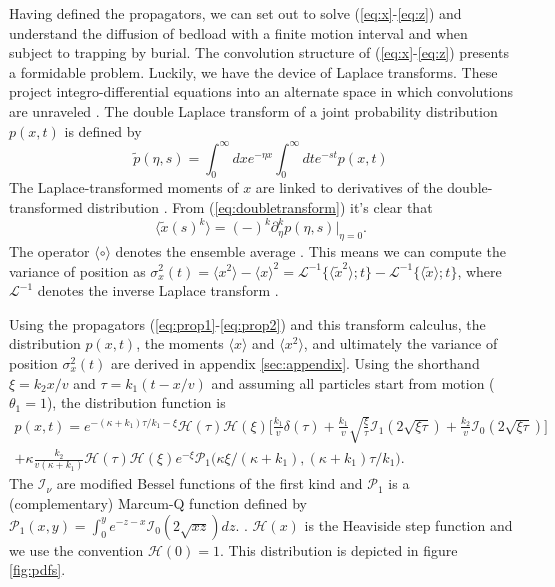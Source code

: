 \documentclass[]{agujournal2018}
\newcommand\be{\begin{equation}}
\newcommand\ee{\end{equation}}
\newcommand\bra{\langle}
\newcommand\ket{\rangle}
\newcommand\El{\mathcal{L}}
\begin{document}
Having defined the propagators, we can set out to solve (\ref{eq:x}-\ref{eq:z}) and understand the diffusion of bedload with a finite motion interval and when subject to trapping by burial.
The convolution structure of (\ref{eq:x}-\ref{eq:z}) presents a formidable problem.
Luckily, we have the device of Laplace transforms.
These project integro-differential equations into an alternate space in which convolutions are unraveled \citep[e.g.][]{Arfken1985}.
The double Laplace transform of a joint probability distribution $p(x,t)$ is defined by 
\be \tilde{p}(\eta,s) = \int_0^\infty dx e^{-\eta x}\int_0^\infty dt e^{-st} p(x,t) \label{eq:doubletransform}\ee
The Laplace-transformed moments of $x$ are linked to derivatives of the double-transformed distribution \citep[e.g.][]{Weeks1998}.
From (\ref{eq:doubletransform}) it's clear that
\be \bra \tilde{x}(s)^k \ket = (-)^k\partial_\eta^k p(\eta,s)\Big|_{\eta=0}.\ee
The operator $\bra \circ \ket$ denotes the ensemble average \citep[e.g.][]{Kittel1958}.
This means we can compute the variance of position as $\sigma_x^2(t) = \bra x^2 \ket - \bra x \ket^2 = \El^{-1} \Big\{\bra\tilde{x}^2 \ket;t\Big\} - \El^{-1} \Big\{\bra\tilde{x} \ket;t\Big\}$, where $\El^{-1}$ denotes the inverse Laplace transform \citep[e.g.][]{Arfken1985}.


Using the propagators (\ref{eq:prop1}-\ref{eq:prop2}) and this transform calculus, the distribution $p(x,t)$, the moments $\bra x \ket$ and $\bra x^2 \ket$, and ultimately the variance of position $\sigma_x^2(t)$ are derived in appendix \ref{sec:appendix}. Using the shorthand $\xi = k_2 x/v$ and $\tau = k_1(t-x/v)$ \citep[c.f.][]{Lisle1998} and assuming all particles start from motion ($\theta_1=1$), the distribution function is 
\begin{multline}
p(x,t) = e^{-(\kappa + k_1)\tau/k_1-\xi}\mathcal{H}(\tau)\mathcal{H}(\xi)\Bigg[\frac{k_1}{v}\delta(\tau) + \frac{k_1}{v} \sqrt{\frac{\xi}{\tau}}\mathcal{I}_1(2\sqrt{\xi\tau}) + \frac{k_2}{v} \mathcal{I}_0(2\sqrt{\xi\tau})\Bigg]\\
+ \kappa \frac{k_2}{v(\kappa+k_1)}\mathcal{H}(\tau)\mathcal{H}(\xi)e^{-\xi}\mathcal{P}_1\big(\kappa\xi/(\kappa+k_1), (\kappa+k_1)\tau/k_1\big).
\label{eq:pdf}
\end{multline}
The $\mathcal{I}_\nu$ are modified Bessel functions of the first kind and $\mathcal{P}_1$ is a (complementary) Marcum-Q function defined by $\mathcal{P}_1(x,y) = \int_0^y e^{-z-x}\mathcal{I}_0(2\sqrt{xz})dz. $ \citep{Marcum1960,Temme1996}. $\mathcal{H}(x)$ is the Heaviside step function and we use the convention $\mathcal{H}(0)=1$.
This distribution is depicted in figure \ref{fig:pdfs}.
\end{document}
